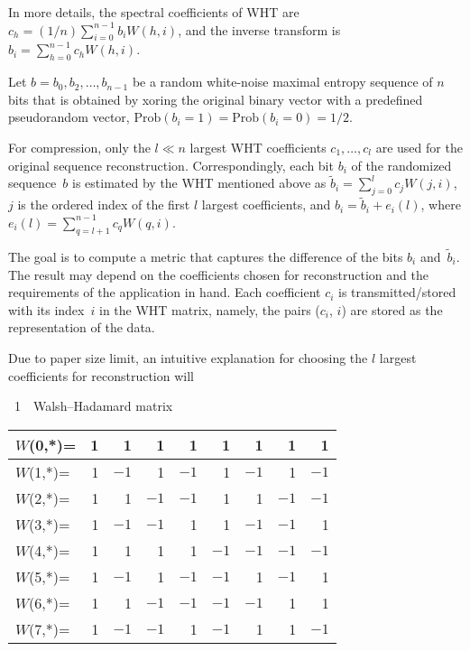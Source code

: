 \begin{multicols}{2}
In more details, the spectral coefficients of WHT are $c_h=(1/n) \sum\limits_{i=0}^{n-1} 
b_i W(h,i)$,
and the inverse transform is $b_i= \sum\limits_{h=0}^{n-1} c_h W(h,i)$.

Let $b=b_0,b_2,\ldots,b_{n-1}$ be a random white-noise maximal entropy
sequence of $n$ bits  that is obtained by xoring the original binary vector with a predefined pseudorandom 
vector, $\mathrm{Prob}\left(b_i=1\right)=\mathrm{Prob}\left(b_i=0\right)$\linebreak $=1/2$.


For compression, only the $l \ll n$ largest WHT
coefficients $c_1,\ldots,c_l$ are used for the original sequence reconstruction.
Correspondingly,   each bit $b_i$ of the randomized sequence~$b$ is  estimated by the
WHT mentioned above as  $\tilde b_i = \sum\limits_{j=0}^{l} c_j W(j,i)$, 
$j$ is the ordered index of the first $l$ largest coefficients, and  
$ b_i=\tilde b_i +e_i(l)$, where  $e_i(l)= \sum\limits_{q=l+1}^{n-1} c_q W(q,i)$.

The goal is to compute a metric that captures the difference of the bits $b_i$ 
and~$\tilde b_i$.  The
result may depend on the coefficients chosen for
reconstruction and the requirements of the application in hand. 
Each coefficient $c_i$ is transmitted/stored with its index~$i$ in the WHT matrix, 
namely, the pairs ($c_i$, $i$) are stored as the representation of the data.

Due to paper size limit,  an intuitive explanation for choosing the $l$ 
largest coefficients   for reconstruction will\linebreak\vspace*{-12pt}


\pagebreak

{\small  %
\begin{center}
{{\tablename~1}\ \ \small{Walsh--Hadamard matrix}}
\end{center}

\tabcolsep=5.7pt
\begin{center}
\begin{tabular}{|l|r|r|r|r|r|r|r|r|}
\hline
$W$(0,*)= & 1 & 1 & 1 & 1 & 1 & 1 & 1 & 1\\
\hline
$W$(1,*)= & 1 &$-1$ & 1 &$-1$ & 1 &$-1$ & 1 &$-1$\\
\hline
$W$(2,*)= & 1 & 1 &$-1$ &$-1$ & 1 & 1 &$-1$ &$-1$\\
\hline
$W$(3,*)= & 1 &$-1$ &$-1$ & 1 & 1 &$-1$ &$-1$ & 1\\
\hline
$W$(4,*)= & 1 & 1 & 1 & 1 &$-1$ &$-1$ &$-1$ &$-1$\\
\hline
$W$(5,*)= & 1 &$-1$ & 1 &$-1$ &$-1$ & 1 &$-1$ & 1\\
\hline
$W$(6,*)= & 1 & 1 &$-1$ &$-1$ &$-1$ &$-1$ & 1 & 1\\
\hline
$W$(7,*)= & 1 &$-1$ &$-1$ & 1 &$-1$ & 1 & 1 &$-1$\\
\hline
\end{tabular}
\end{center}

}
\end{multicols}
